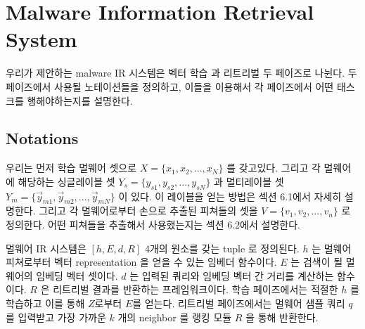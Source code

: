 \section{Malware Information Retrieval System}
우리가 제안하는 malware IR 시스템은 벡터 학습 과 리트리벌 두 페이즈로 나뉜다. 두 페이즈에서 사용될 노테이션들을 정의하고, 이들을 이용해서 각 페이즈에서 어떤 태스크를 행해야하는지를 설명한다. 




%









\subsection{Notations}

우리는 먼저 학습 멀웨어 셋으로 $X = \{x_1, x_2, ..., x_N\}$ 를 갖고있다. 그리고 각 멀웨어에 해당하는 싱글레이블 셋 $Y_s = \{y_{s1}, y_{s2}, ..., y_{sN}\}$ 과 멀티레이블 셋 $Y_m = \{\vec{y}_{m1}, \vec{y}_{m2}, ... , \vec{y}_{mN}\}$ 이 있다. 이 레이블을 얻는 방법은 섹션 6.1에서 자세히 설명한다. 그리고 각 멀웨어로부터 손으로 추출된 피쳐들의 셋을 $V = \{v_1, v_2, ..., v_n \}$ 로 정의한다. 어떤 피쳐들을 추출해서 사용했는지는 섹션 6.2에서 설명한다. 

멀웨어 IR 시스템은 $[h, E, d, R]$ 4개의 원소를 갖는 tuple 로 정의된다. $h$ 는 멀웨어 피쳐로부터 벡터 representation 을 얻을 수 있는 임베더 함수이다. $E$ 는 검색이 될 멀웨어의 임베딩 벡터 셋이다. $d$ 는 입력된 쿼리와 임베딩 벡터 간 거리를 계산하는 함수이다. $R$ 은 리트리벌 결과를 반환하는 프레임워크이다. 학습 페이즈에서는 적절한 $h$ 를 학습하고 이를 통해 $Z$로부터 $E$를 얻는다. 리트리벌 페이즈에서는 멀웨어 샘플 쿼리 $q$ 를 입력받고 가장 가까운 $k$ 개의 neighbor 를 랭킹 모듈 $R$ 을 통해 반환한다.

